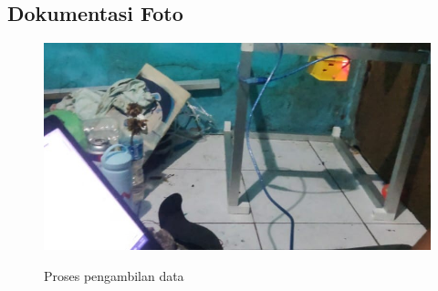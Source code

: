 \subsection{Dokumentasi Foto}
\begin{figure}[!htbp]
    \centering
    \includegraphics[width=0.5\linewidth]{images/Proses-Akuisisi-Data.jpeg}
    \caption{Proses pengambilan data}
    \citep{ajitot2024koefisien}
    \label{fig:pengambilan-data}
\end{figure}

